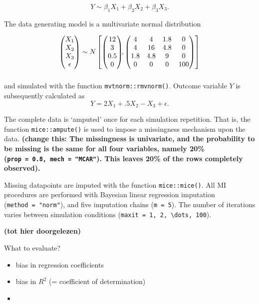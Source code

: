 \documentclass[
  Royal, times, sageapa]{sagej}
\begin{document}
\[Y \sim \beta_1 X_1 + \beta_2 X_2 + \beta_3 X_3.\]

The data generating model is a multivariate normal distribution

\begin{align*}
\begin{pmatrix}X_1\\
X_2\\
X_3\\
\epsilon
\end{pmatrix} \sim  N
\begin{bmatrix}
\begin{pmatrix}
12\\
3\\
0.5\\
0
\end{pmatrix}\!\!,
\begin{pmatrix}
4 & 4 & 1.8 & 0\\
4 & 16 & 4.8 & 0\\
1.8 & 4.8 & 9 & 0\\
0 & 0 & 0 & 100
\end{pmatrix}
\end{bmatrix}\\[2\jot]
\end{align*}

and simulated with the function \texttt{mvtnorm::rmvnorm()}. Outcome
variable \(Y\) is subsequently calculated as
\[Y =  2X_1 + .5X_2 - X_3 + \epsilon .\]

The complete data is `amputed' once for each simulation repetition. That
is, the function \texttt{mice::ampute()} is used to impose a missingness
mechanism upon the data. \textbf{(change this: The missingness is
univariate, and the probability to be missing is the same for all four
variables, namely 20\% (\texttt{prop\ =\ 0.8,\ mech\ =\ "MCAR"}). This
leaves 20\% of the rows completely observed). }

Missing datapoints are imputed with the function \texttt{mice::mice()}.
All MI procedures are performed with Bayesian linear regression
imputation (\texttt{method\ =\ "norm"}), and five imputation chains
(\texttt{m\ =\ 5}). The number of iterations varies between simulation
conditions (\texttt{maxit\ =\ 1,\ 2,\ \textbackslash{}dots,\ 100}).

\textbf{(tot hier doorgelezen)}

What to evaluate?

\begin{itemize}
\item
  bias in regression coefficients
\item
  bias in \(R^2\) (= coefficient of determination)
\item
\end{itemize}
\end{document}
